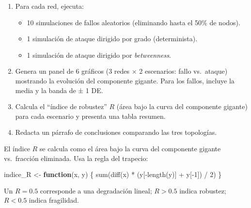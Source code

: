 \documentclass[
  letterpaper,
  DIV=11,
  numbers=noendperiod]{scrreprt}
\newenvironment{Shaded}{\begin{snugshade}}{\end{snugshade}}
\newcommand{\ControlFlowTok}[1]{\textcolor[rgb]{0.00,0.23,0.31}{\textbf{#1}}}
\newcommand{\DecValTok}[1]{\textcolor[rgb]{0.68,0.00,0.00}{#1}}
\newcommand{\FunctionTok}[1]{\textcolor[rgb]{0.28,0.35,0.67}{#1}}
\newcommand{\NormalTok}[1]{\textcolor[rgb]{0.00,0.23,0.31}{#1}}
\newcommand{\OtherTok}[1]{\textcolor[rgb]{0.00,0.23,0.31}{#1}}
\newcommand{\SpecialCharTok}[1]{\textcolor[rgb]{0.37,0.37,0.37}{#1}}
\providecommand{\tightlist}{%
  \setlength{\itemsep}{0pt}\setlength{\parskip}{0pt}}
\begin{document}
\begin{enumerate}
\def\labelenumi{\alph{enumi})}
\item
  Para cada red, ejecuta:

  \begin{itemize}
  \tightlist
  \item
    10 simulaciones de fallos aleatorios (eliminando hasta el 50\% de
    nodos).
  \item
    1 simulación de ataque dirigido por grado (determinista).
  \item
    1 simulación de ataque dirigido por \emph{betweenness}.
  \end{itemize}
\item
  Genera un panel de 6 gráficos (3 redes × 2 escenarios: fallo
  vs.~ataque) mostrando la evolución del componente gigante. Para los
  fallos, incluye la media y la banda de ± 1 DE.
\item
  Calcula el ``índice de robustez'' \(R\) (área bajo la curva del
  componente gigante) para cada escenario y presenta una tabla resumen.
\item
  Redacta un párrafo de conclusiones comparando las tres topologías.
\end{enumerate}

\begin{tcolorbox}[enhanced jigsaw, toprule=.15mm, colframe=quarto-callout-note-color-frame, coltitle=black, titlerule=0mm, colback=white, breakable, leftrule=.75mm, arc=.35mm, bottomtitle=1mm, toptitle=1mm, rightrule=.15mm, bottomrule=.15mm, left=2mm, title=\textcolor{quarto-callout-note-color}{\faInfo}\hspace{0.5em}{💡 Pista 1}, colbacktitle=quarto-callout-note-color!10!white, opacityback=0, opacitybacktitle=0.6]

El índice \(R\) se calcula como el área bajo la curva del componente
gigante vs.~fracción eliminada. Usa la regla del trapecio:

\begin{Shaded}
\begin{Highlighting}[]
\NormalTok{indice\_R }\OtherTok{\textless{}{-}} \ControlFlowTok{function}\NormalTok{(x, y) \{}
  \FunctionTok{sum}\NormalTok{(}\FunctionTok{diff}\NormalTok{(x) }\SpecialCharTok{*}\NormalTok{ (y[}\SpecialCharTok{{-}}\FunctionTok{length}\NormalTok{(y)] }\SpecialCharTok{+}\NormalTok{ y[}\SpecialCharTok{{-}}\DecValTok{1}\NormalTok{]) }\SpecialCharTok{/} \DecValTok{2}\NormalTok{)}
\NormalTok{\}}
\end{Highlighting}
\end{Shaded}

Un \(R = 0.5\) corresponde a una degradación lineal; \(R > 0.5\) indica
robustez; \(R < 0.5\) indica fragilidad.

\end{tcolorbox}
\end{document}
